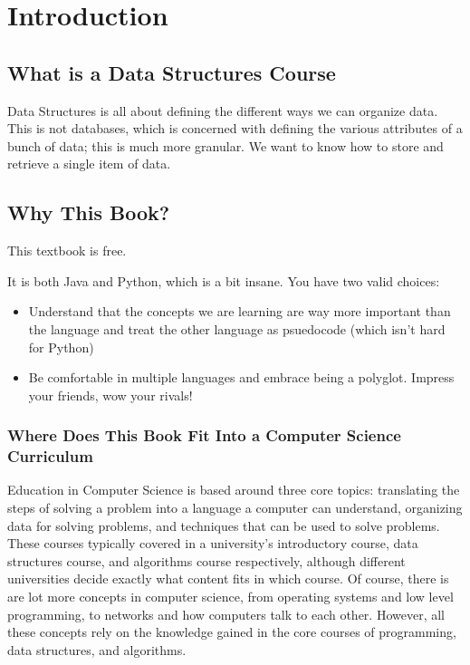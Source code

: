 
\chapter{Introduction}

\section{What is a Data Structures Course}
Data Structures is all about defining the different ways we can organize data.  This is not databases, which is concerned with defining the various attributes of a bunch of data;  this is much more granular.  We want to know how to store and retrieve a single item of data.


\section{Why This Book?}

This textbook is free.

It is both Java and Python, which is a bit insane.  You have two valid choices: 
\begin{itemize}
	\item Understand that the concepts we are learning are way more important than the language and treat the other language as psuedocode (which isn't hard for Python)
	\item Be comfortable in multiple languages and embrace being a polyglot.  Impress your friends, wow your rivals!
	
\end{itemize}



\subsection{Where Does This Book Fit Into a Computer Science Curriculum }

Education in Computer Science is based around three core topics: translating the steps of solving a problem into a language a computer can understand, organizing data for solving problems, and techniques that can be used to solve problems. %
These courses typically covered in a university's introductory course, data structures course, and algorithms course respectively, although different universities decide exactly what content fits in which course.
Of course, there is are lot more concepts in computer science, from operating systems and low level programming,  to networks and how computers talk to each other. However, all these concepts rely on the knowledge gained in the core courses of programming, data structures, and algorithms.



